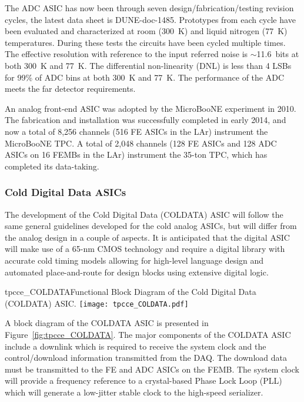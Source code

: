 The ADC ASIC has now been through seven design/fabrication/testing revision cycles, 
the latest data sheet is DUNE-doc-1485.
Prototypes from each cycle have been evaluated and characterized at room (300~K) and liquid nitrogen (77~K) temperatures.
During these tests the circuits have been cycled multiple times.
The effective resolution with reference to the input referred noise is $\sim$11.6~bits at both 300~K and 77~K.
The differential non-linearity (DNL) is less than 4 LSBs for 99\% of ADC bins at both 300~K and 77~K.
The performance of the ADC meets the far detector requirements.

An analog front-end ASIC was adopted by the MicroBooNE experiment in 2010.\cite{noise_filter}
The fabrication and installation was successfully completed in early 2014, and now 
a total of 8,256 channels (516 FE ASICs in the LAr) instrument the MicroBooNE TPC. 
A total of 2,048 channels (128 FE ASICs and 128 ADC ASICs on 16 FEMBs in the LAr) instrument the 35-ton 
TPC, which has completed its data-taking.


%
\subsubsection{Cold Digital Data ASICs}
\label{subsubsec:fe_CMOS_digital}

The development of the Cold Digital Data (COLDATA) ASIC will follow the same general 
guidelines developed for the cold analog ASICs,
but will differ from the analog design in a couple of aspects.
It is anticipated that the digital ASIC will make use of a 65-nm CMOS technology and require a
digital library with accurate cold timing models allowing for high-level language design and
automated place-and-route for design blocks using extensive digital logic.

\begin{cdrfigure}{tpcce_COLDATA}{Functional Block Diagram of the Cold Digital Data (COLDATA) ASIC.}
\texttt{[image: tpcce\_COLDATA.pdf]}
\end{cdrfigure}

A block diagram of the COLDATA ASIC is presented in Figure~\ref{fig:tpcce_COLDATA}.
The major components of the COLDATA ASIC include a downlink which is required to receive the system clock and
the control/download information transmitted from the DAQ.
The download data must be transmitted to the FE and ADC ASICs on the FEMB.
The system clock will provide a frequency reference to a crystal-based Phase Lock Loop (PLL)
which will generate a low-jitter stable clock to the high-speed serializer.

